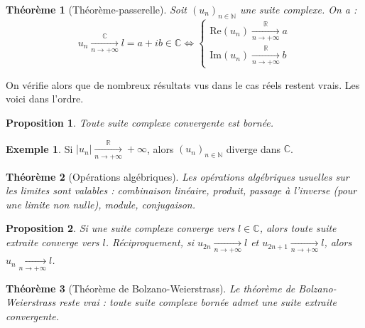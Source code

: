 \documentclass[french]{book}
\newcommand{\N}{\mathbb{N}}
\newcommand{\R}{\mathbb{R}}
\newcommand{\C}{\mathbb{C}}
\theoremstyle{plain}
\newtheorem{thm}{Théorème}[chapter]
\newtheorem{prop}{Proposition}[chapter]
\theoremstyle{definition}
\newtheorem{exa}{Exemple}[chapter]
\theoremstyle{remark}
\begin{document}
\begin{thm}[Théorème-passerelle]
	Soit $(u_n)_{n\in\N}$ une suite complexe. On a : $$u_n\xrightarrow[n\to+\infty]{\C}l=a+ib\in\C \iff \left \{\begin{array}{ll}\text{Re}(u_n)\xrightarrow[n\to+\infty]{\R}a \\ \text{Im}(u_n)\xrightarrow[n\to+\infty]{\R}b\end{array}\right.$$
\end{thm}
On vérifie alors que de nombreux résultats vus dans le cas réels restent vrais. Les voici dans l'ordre.
\begin{prop}
	Toute suite complexe convergente est bornée.
\end{prop}
\begin{exa}
	Si $\lvert u_n\rvert \xrightarrow[n\to+\infty]{\R}+\infty$, alors $(u_n)_{n\in\N}$ diverge dans $\C$.
\end{exa}
\begin{thm}[Opérations algébriques]
	Les opérations algébriques usuelles sur les limites sont valables : combinaison linéaire, produit, passage à l'inverse (pour une limite non nulle), module, conjugaison.
\end{thm}
\begin{prop}
	Si une suite complexe converge vers $l\in\C$, alors toute suite extraite converge vers $l$. Réciproquement, si $u_{2n}\xrightarrow[n\to+\infty]{}l$ et $u_{2n+1}\xrightarrow[n\to+\infty]{}l$, alors $u_{n}\xrightarrow[n\to+\infty]{}l$.
\end{prop}
\begin{thm}[Théorème de Bolzano-Weierstrass]
	Le théorème de Bolzano-Weierstrass reste vrai : toute suite complexe bornée admet une suite extraite convergente.
\end{thm}
\end{document}
